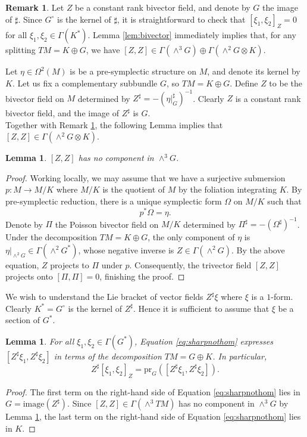 \documentclass[11pt,thmsa]{amsart}
\newtheorem{lemma}[theorem]{Lemma}
\theoremstyle{definition}
\newtheorem{remark}[theorem]{Remark}
\begin{document}
{\begin{remark}\label{rem:nokkk}
Let $Z$ be a constant rank bivector field, and denote by $G$ the image of $\sharp$. Since $G^{\circ}$ is the kernel of $\sharp$, it is straightforward to check that $[\xi_1,\xi_2]_{Z}=0$ for all $\xi_1,\xi_2\in\Gamma(K^*)$. Lemma \ref{lem:bivector} immediately implies that, for any splitting $TM=K\oplus G$, we have
$[Z,Z]\in \Gamma(\wedge^3 G)\oplus \Gamma(\wedge^2 G\otimes K)$.
\end{remark} 
}

Let $\eta\in \Omega^2(M)$ is be a pre-symplectic structure on $M$, and denote its kernel by $K$.
Let us fix a complementary subbundle $G$, so $TM=K\oplus G$. Define $Z$ to be the bivector field on $M$ determined by
$ Z^{\sharp} = -(\eta\vert_G^\sharp)^{-1}$. Clearly $Z$ is a constant rank bivector field, and the image of $ Z^{\sharp}$ is $G$.\\



 
Together with  Remark \ref{rem:nokkk}, the following Lemma implies that  $[Z,Z]\in \Gamma(\wedge^2G\otimes K)$.
\begin{lemma}\label{lem:noggg}
$[Z,Z]$ has no component in $\wedge^3 G$. \end{lemma}
\begin{proof}
Working locally, we may assume that we have a surjective submersion $p\colon M\to M/K$ where $M/K$ is the quotient of $M$ by the foliation integrating $K$. By pre-symplectic reduction, there is a unique symplectic form $\Omega$ on $M/K$ such that $$p^*\Omega=\eta.$$ Denote by $\Pi$ the Poisson bivector field on $M/K$ determined by $ \Pi^{\sharp} = -(\Omega^\sharp)^{-1}$. Under the decomposition $TM=K\oplus G$, the only component of $\eta$ is $\eta|_{\wedge^2G}\in \Gamma(\wedge^2 G^*)$, whose negative inverse is $Z\in \Gamma(\wedge^2G)$. By the above equation, $Z$ projects to $\Pi$ under $p$. Consequently, the trivector
field $[Z,Z]$ projects onto $[\Pi,\Pi]=0$, finishing the proof.
\end{proof}


We wish to understand the Lie bracket of vector fields $ Z^{\sharp} \xi$ where $\xi$ is a $1$-form.
Clearly  $K^*=G^{\circ}$ is the kernel of $ Z^{\sharp}$. Hence it is sufficient to assume that $\xi$ be a section of $G^*$.
\begin{lemma}\label{lem:morG*}
 For all $\xi_1,\xi_2\in \Gamma(G^*)$, Equation \eqref{eq:sharpnothom}
expresses $[ Z^{\sharp} \xi_1, Z^{\sharp} \xi_2]$ in terms of the decomposition $TM=G\oplus K$. In particular,
$$Z^{\sharp}[\xi_1,\xi_2]_Z=\mathrm{pr}_G([ Z^{\sharp} \xi_1, Z^{\sharp} \xi_2]).$$
\end{lemma}
\begin{proof}
The first term on the right-hand side of Equation \eqref{eq:sharpnothom} lies in $G=\mathrm{image}( Z^{\sharp})$.
Since $[Z,Z]\in \Gamma(\wedge^3 TM)$ has no component in $\wedge^3 G$  by Lemma \ref{lem:noggg}, the last term on the right-hand side of Equation \eqref{eq:sharpnothom} lies in $K$.
\end{proof}
 
\end{document}
